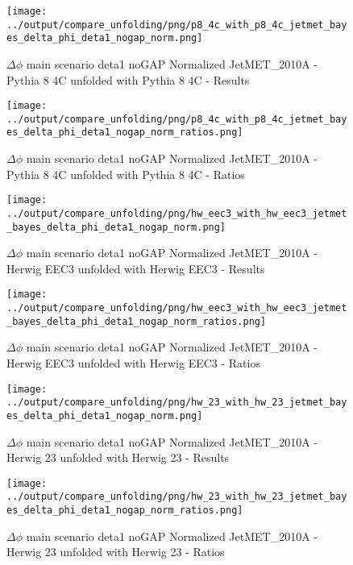 \documentclass[11pt]{book}
\begin{document}
\begin{figure}[ht]
\centering
\texttt{[image: ../output/compare\_unfolding/png/p8\_4c\_with\_p8\_4c\_jetmet\_bayes\_delta\_phi\_deta1\_nogap\_norm.png]}
\caption{$\Delta\phi$ main scenario deta1 noGAP Normalized JetMET\_2010A - Pythia 8 4C unfolded with Pythia 8 4C - Results}
\label{p8_p8_jetmet_bayes_delta_phi_deta1_nogap_norm_a}
\end{figure}

\begin{figure}[ht]
\centering
\texttt{[image: ../output/compare\_unfolding/png/p8\_4c\_with\_p8\_4c\_jetmet\_bayes\_delta\_phi\_deta1\_nogap\_norm\_ratios.png]}
\caption{$\Delta\phi$ main scenario deta1 noGAP Normalized JetMET\_2010A - Pythia 8 4C unfolded with Pythia 8 4C - Ratios}
\label{p8_p8_jetmet_bayes_delta_phi_deta1_nogap_norm_b}
\end{figure}

\begin{figure}[ht]
\centering
\texttt{[image: ../output/compare\_unfolding/png/hw\_eec3\_with\_hw\_eec3\_jetmet\_bayes\_delta\_phi\_deta1\_nogap\_norm.png]}
\caption{$\Delta\phi$ main scenario deta1 noGAP Normalized JetMET\_2010A - Herwig EEC3 unfolded with Herwig EEC3 - Results}
\label{hw_eec3_hw_eec3_jetmet_bayes_delta_phi_deta1_nogap_norm_a}
\end{figure}

\begin{figure}[ht]
\centering
\texttt{[image: ../output/compare\_unfolding/png/hw\_eec3\_with\_hw\_eec3\_jetmet\_bayes\_delta\_phi\_deta1\_nogap\_norm\_ratios.png]}
\caption{$\Delta\phi$ main scenario deta1 noGAP Normalized JetMET\_2010A - Herwig EEC3 unfolded with Herwig EEC3 - Ratios}
\label{hw_eec3_hw_eec3_jetmet_bayes_delta_phi_deta1_nogap_norm_b}
\end{figure}

\begin{figure}[ht]
\centering
\texttt{[image: ../output/compare\_unfolding/png/hw\_23\_with\_hw\_23\_jetmet\_bayes\_delta\_phi\_deta1\_nogap\_norm.png]}
\caption{$\Delta\phi$ main scenario deta1 noGAP Normalized JetMET\_2010A - Herwig 23 unfolded with Herwig 23 - Results}
\label{hw_23_hw_23_jetmet_bayes_delta_phi_deta1_nogap_norm_a}
\end{figure}

\begin{figure}[ht]
\centering
\texttt{[image: ../output/compare\_unfolding/png/hw\_23\_with\_hw\_23\_jetmet\_bayes\_delta\_phi\_deta1\_nogap\_norm\_ratios.png]}
\caption{$\Delta\phi$ main scenario deta1 noGAP Normalized JetMET\_2010A - Herwig 23 unfolded with Herwig 23 - Ratios}
\label{hw_23_hw_23_jetmet_bayes_delta_phi_deta1_nogap_norm_b}
\end{figure}
\end{document}

